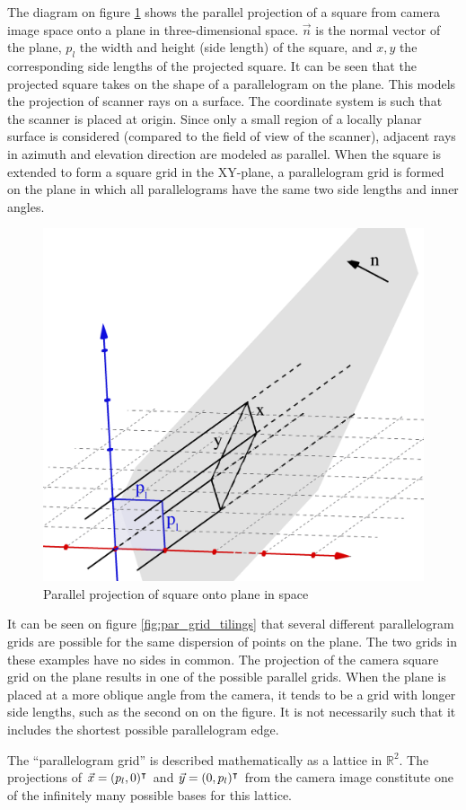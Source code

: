 The diagram on figure \ref{fig:pargrid_proj} shows the parallel projection of a square from camera image space onto a plane in three-dimensional space. $\vec{n}$ is the normal vector of the plane, $p_l$ the width and height (side length) of the square, and $x, y$ the corresponding side lengths of the projected square. It can be seen that the projected square takes on the shape of a parallelogram on the plane. This models the projection of scanner rays on a surface. The coordinate system is such that the scanner is placed at origin. Since only a small region of a locally planar surface is considered (compared to the field of view of the scanner), adjacent rays in azimuth and elevation direction are modeled as parallel. When the square is extended to form a square grid in the XY-plane, a parallelogram grid is formed on the plane in which all parallelograms have the same two side lengths and inner angles.

\begin{figure}[h]
\centering
\includegraphics[width=.4\textwidth]{fig/pargrid_proj.png}
\caption{Parallel projection of square onto plane in space}
\label{fig:pargrid_proj}
\end{figure}

It can be seen on figure \ref{fig:par_grid_tilings} that several different parallelogram grids are possible for the same dispersion of points on the plane. The two grids in these examples have no sides in common. The projection of the camera square grid on the plane results in one of the possible parallel grids. When the plane is placed at a more oblique angle from the camera, it tends to be a grid with longer side lengths, such as the second on on the figure. It is not necessarily such that it includes the shortest possible parallelogram edge.

The ``parallelogram grid'' is described mathematically as a lattice in $\mathbb{R}^2$. The projections of $\vec{x} = (p_l, 0)^\intercal$ and $\vec{y} = (0, p_l)^\intercal$ from the camera image constitute one of the infinitely many possible bases for this lattice. \cite{Galb2012}

